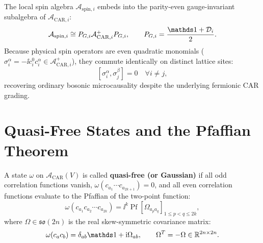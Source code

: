 \begin{theorem}
\label{thm:m1_1b_parity_superselection}
The local spin algebra $\mathcal{A}_{\mathrm{spin}, i}$ embeds into the parity-even gauge-invariant subalgebra of $\mathcal{A}_{\mathrm{CAR}, i}$:
\begin{equation}
\label{eq:m1_1b_spin_embedding}
\mathcal{A}_{\mathrm{spin}, i} \cong P_{G, i} \mathcal{A}_{\mathrm{CAR}, i}^+ P_{G, i}, \qquad P_{G, i} = \frac{\Id + \mathcal{D}_i}{2}.
\end{equation}
Because physical spin operators are even quadratic monomials ($\sigma_i^\alpha = -\ii c_i^0 c_i^\alpha \in \mathcal{A}_{\mathrm{CAR}, i}^+$), they commute identically on distinct lattice sites:
\begin{equation}
\label{eq:m1_1b_spin_commutativity}
[\sigma_i^\alpha, \sigma_j^\beta] = 0 \quad \forall i \ne j,
\end{equation}
recovering ordinary bosonic microcausality despite the underlying fermionic CAR grading.
\end{theorem}

\section{Quasi-Free States and the Pfaffian Theorem}
\label{sec:m1_1b_quasifree_states}

\begin{definition}
\label{def:m1_1b_quasifree_state}
A state $\omega$ on $\mathcal{A}_{\mathrm{CAR}}(V)$ is called \textbf{quasi-free (or Gaussian)} if all odd correlation functions vanish, $\omega(c_{a_1} \cdots c_{a_{2k+1}}) = 0$, and all even correlation functions evaluate to the Pfaffian of the two-point function:
\begin{equation}
\label{eq:m1_1b_pfaffian_wick}
\omega(c_{a_1} c_{a_2} \cdots c_{a_{2k}}) = \ii^k \operatorname{Pf}\left[ \Omega_{a_p a_q} \right]_{1 \le p < q \le 2k},
\end{equation}
where $\Omega \in \mathfrak{so}(2n)$ is the real skew-symmetric covariance matrix:
\begin{equation}
\label{eq:m1_1b_covariance_def}
\omega(c_a c_b) = \delta_{ab}\Id + \ii \Omega_{ab}, \qquad \Omega^T = -\Omega \in \mathbb{R}^{2n \times 2n}.
\end{equation}
\end{definition}

